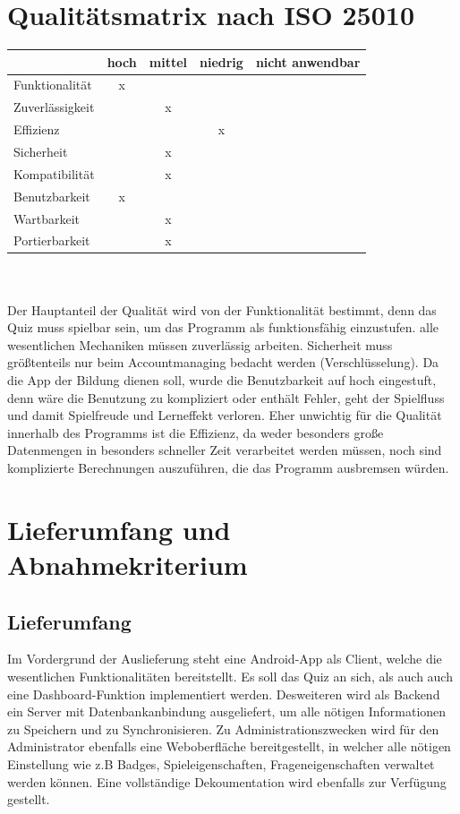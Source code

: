 \documentclass[11pt,a4paper]{scrreprt}
\begin{document}
\chapter{Qualitätsmatrix nach ISO 25010}
\begin{tabular}{|l|c|c|c|c|}
\hline
		& hoch & mittel & niedrig& nicht anwendbar\\
\hline
Funktionalität  &x              &              & 		&\\     
Zuverlässigkeit	&              & x             & 		&\\
Effizienz 		&              &              & x		&\\
Sicherheit  	&              & x             & 		&\\
Kompatibilität  &              &x              & 		&\\
Benutzbarkeit  	& x             &              & 		&\\
Wartbarkeit  	&              &x              & 		&\\
Portierbarkeit  &              &x              & 		&\\
\hline
\end{tabular}\\ \\
Der Hauptanteil der Qualität wird von der Funktionalität bestimmt, denn das Quiz muss spielbar sein, um das Programm als funktionsfähig einzustufen. alle wesentlichen Mechaniken müssen zuverlässig arbeiten. Sicherheit muss größtenteils nur beim Accountmanaging bedacht werden (Verschlüsselung). Da die App der Bildung dienen soll, wurde die Benutzbarkeit auf hoch eingestuft, denn wäre die Benutzung zu kompliziert oder enthält Fehler, geht der Spielfluss und damit Spielfreude und Lerneffekt verloren. Eher unwichtig für die Qualität innerhalb des Programms ist die Effizienz, da weder besonders große Datenmengen in besonders schneller Zeit verarbeitet werden müssen, noch sind komplizierte Berechnungen auszuführen, die das Programm ausbremsen würden.

\chapter{Lieferumfang und Abnahmekriterium}
\section{Lieferumfang}
Im Vordergrund der Auslieferung steht eine Android-App als Client, welche die wesentlichen Funktionalitäten bereitstellt. Es soll das Quiz an sich, als auch auch eine Dashboard-Funktion implementiert werden. Desweiteren wird als Backend ein Server mit Datenbankanbindung ausgeliefert, um alle nötigen Informationen zu Speichern und zu Synchronisieren. Zu Administrationszwecken wird für den Administrator ebenfalls eine Weboberfläche bereitgestellt, in welcher alle nötigen Einstellung wie z.B Badges, Spieleigenschaften, Frageneigenschaften verwaltet werden können. Eine vollständige Dekoumentation wird ebenfalls zur Verfügung gestellt.
\end{document}
